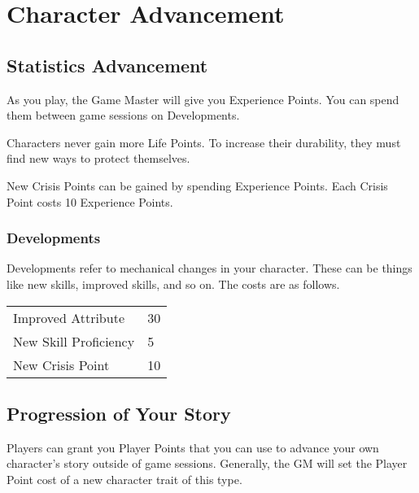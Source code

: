 \chapter{Character Advancement}

\begin{multicols}{2}

\section{Statistics Advancement}

As you play, the Game Master will give you Experience Points. You
can spend them between game sessions on Developments.

Characters never gain more Life Points. To increase their durability,
they must find new ways to protect themselves.

New Crisis Points can be gained by spending Experience Points. Each
Crisis Point costs 10 Experience Points.

\subsection{Developments}

Developments refer to mechanical changes in your character. These can
be things like new skills, improved skills, and so on. The costs are
as follows.

\begin{center}
{
\begin{xtabular}{|l|l|}
Improved Attribute & 30 \\
New Skill Proficiency & 5 \\
New Crisis Point & 10 \\
\hline
\end{xtabular}
}
\end{center}

\section{Progression of Your Story}

Players can grant you Player Points that you can use to advance your own
character's story outside of game sessions. Generally, the GM will set the
Player Point cost of a new character trait of this type.

\end{multicols}
